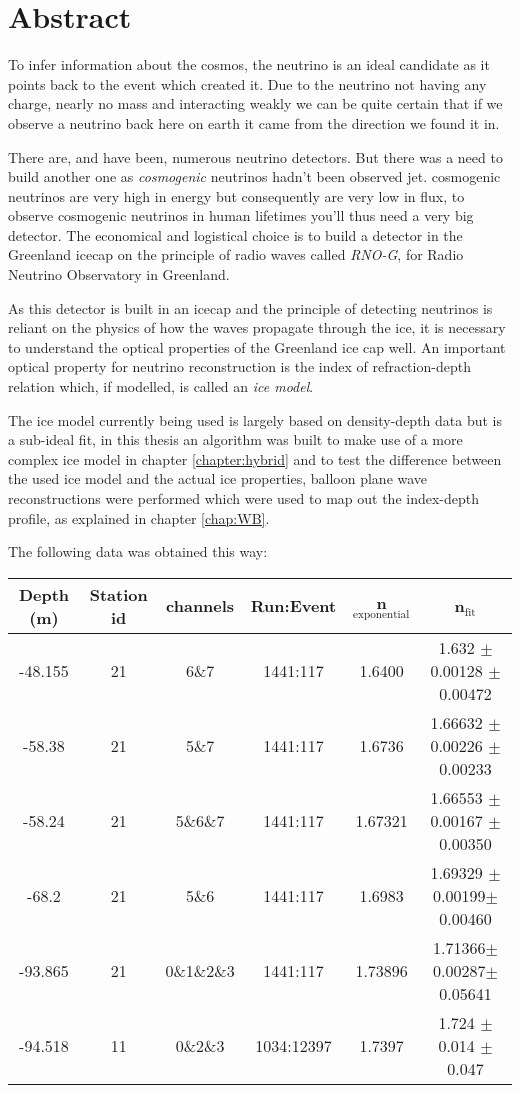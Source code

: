 \chapter*{Abstract}
To infer information about the cosmos, the neutrino is an ideal candidate as it
points back to the event which created it.  Due to the neutrino not having any charge,
nearly no mass and interacting weakly we can be quite certain that if we
observe a neutrino back here on earth it came from the direction we found it in.

There are, and have been, numerous neutrino detectors. But there was a need to 
build another one as \textit{cosmogenic} neutrinos hadn't been observed jet.
cosmogenic neutrinos are very high in energy but consequently are very low in flux,
to observe cosmogenic neutrinos in human lifetimes you'll thus need a very big detector.
The economical and logistical choice is to build a detector in the Greenland icecap
on the principle of radio waves called \textit{RNO-G}, for Radio Neutrino Observatory
in Greenland.

As this detector is built in an icecap and the principle of detecting neutrinos is reliant
on the physics of how the waves propagate through the ice, it is necessary to understand 
the optical properties of the Greenland ice cap well. An important optical property
for neutrino reconstruction is the index of refraction-depth relation which, if modelled,
is called an \textit{ice model}.

The ice model currently being used is largely based on density-depth data but is 
a sub-ideal fit, in this thesis an algorithm was built to make use of a more complex
ice model in chapter \ref{chapter:hybrid} and to test the difference between the
used ice model and the actual ice properties, balloon plane wave reconstructions were
performed which were used to map out the index-depth profile, as explained in chapter \ref{chap:WB}.

The following data was obtained this way:
\begin{center}
\begin{tabular}{||c c c c c c||}
 \hline
 Depth (m) & Station id & channels & Run:Event & n$_\text{exponential}$ & n$_\text{fit}$\\ [0.5ex]
 \hline\hline
 -48.155 & 21 & 6\&7 & 1441:117 & 1.6400 & 1.632 $\pm$ 0.00128 $\pm$ 0.00472\\
 -58.38 & 21 & 5\&7 & 1441:117 & 1.6736 & 1.66632 $\pm$ 0.00226 $\pm$ 0.00233 \\
 -58.24 & 21 & 5\&6\&7 & 1441:117 & 1.67321 & 1.66553 $\pm$ 0.00167 $\pm$ 0.00350 \\
 -68.2 & 21 & 5\&6 & 1441:117 & 1.6983 & 1.69329 $\pm$0.00199$\pm$0.00460 \\
 -93.865 & 21 & 0\&1\&2\&3 & 1441:117 & 1.73896 & 1.71366$\pm$0.00287$\pm$0.05641\\
 -94.518 & 11 & 0\&2\&3 & 1034:12397 & 1.7397 & 1.724 $\pm$ 0.014 $\pm$ 0.047 \\
 \hline
\end{tabular}
\end{center}
\newpage

